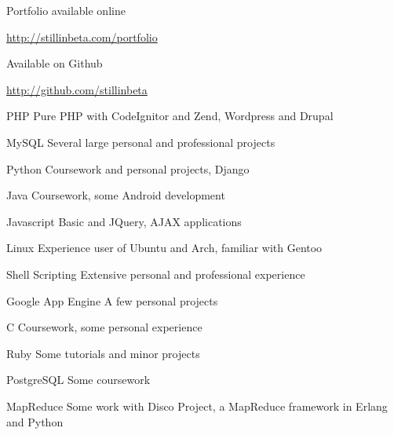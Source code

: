 \documentclass[letterpaper,11pt,notitlepage]{article}
\begin{document}
\vbar
{}
        \begin{employment}
            \item Portfolio available online
            \item \url{http://stillinbeta.com/portfolio}
        \end{employment}
        \begin{employment}
            \item Available on Github
            \item \url{http://github.com/stillinbeta}
        \end{employment}
\vbar
{}
\begin{description*}
\item[PHP] Pure PHP with CodeIgnitor and Zend, Wordpress and Drupal
\item[MySQL] Several large personal and professional projects
\item[Python] Coursework and personal projects, Django
\item[Java] Coursework, some Android development
\item[Javascript] Basic and JQuery, AJAX applications
\item[Linux] Experience user of Ubuntu and Arch, familiar with Gentoo
\item[Shell Scripting] Extensive personal and professional experience
\item[Google App Engine] A few personal projects
\item 
\item[C] Coursework, some personal experience
\item[Ruby] Some tutorials and minor projects
\item[PostgreSQL] Some coursework
\item[MapReduce] Some work with Disco Project, a MapReduce framework in 
    Erlang and Python
\end{description*}
\end{document}
